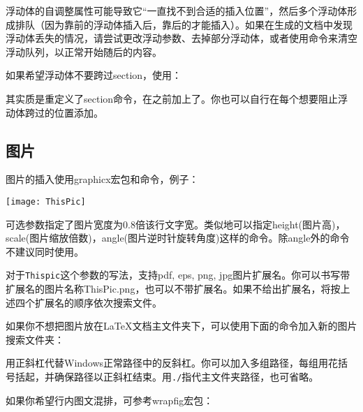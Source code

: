 {浮动体的自调整属性可能导致它“一直找不到合适的插入位置”，然后多个浮动体形成排队（因为靠前的浮动体插入后，靠后的才能插入）。如果在生成的文档中发现浮动体丢失的情况，请尝试更改浮动参数、去掉部分浮动体，或者使用\latexline{\\clearpage}命令来清空浮动队列，以正常开始随后的内容。

如果希望浮动体不要跨过section，使用：
\begin{latex}{}
\usepackage[section]{placeins}
\end{latex}

其实质是重定义了section命令，在之前加上了\latexline{\\FloatBarrier}。你也可以自行在每个想要阻止浮动体跨过的位置添加。

\subsection{图片}
图片的插入使用graphicx宏包和命令，例子：
\begin{latex}{}
\begin{center}
  \texttt{[image: ThisPic]}
\end{center}
\end{latex}

可选参数指定了图片宽度为0.8倍该行文字宽。类似地可以指定height(图片高)，scale(图片缩放倍数)，angle(图片逆时针旋转角度)这样的命令。除angle外的命令不建议同时使用。

对于\texttt{Thispic}这个参数的写法，\xelatex 支持pdf, eps, png, jpg图片扩展名。你可以书写带扩展名的图片名称ThisPic.png，也可以不带扩展名。如果不给出扩展名，将按上述四个扩展名的顺序依次搜索文件。\dpar

如果你不想把图片放在\LaTeX 文档主文件夹下，可以使用下面的命令加入新的图片搜索文件夹：
\begin{latex}{}
\graphicspath{{c:/pics/}{./pic/}}
\end{latex}

用正斜杠代替Windows正常路径中的反斜杠。你可以加入多组路径，每组用花括号括起，并确保路径以正斜杠结束。用\verb|./|指代主文件夹路径，也可省略。\dpar

如果你希望行内图文混排，可参考wrapfig宏包：
\begin{latex}{}
\end{latex}

}
